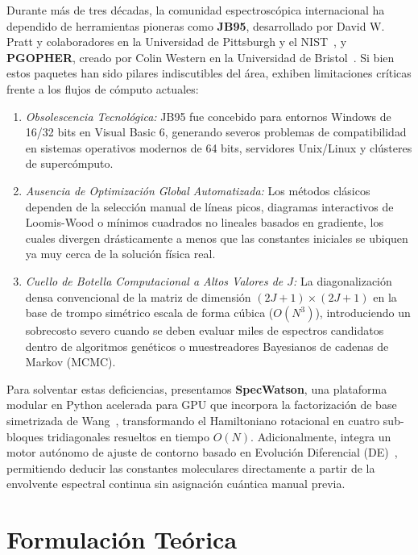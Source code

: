 \documentclass[aps,jcp,reprint,twocolumn,superscriptaddress,showpacs,amsmath,amssymb]{revtex4-2}
\begin{document}
Durante m\'as de tres d\'ecadas, la comunidad espectrosc\'opica internacional ha dependido de herramientas pioneras como \textbf{JB95}, desarrollado por David W. Pratt y colaboradores en la Universidad de Pittsburgh y el NIST~\cite{alvarez2006rotationally}, y \textbf{PGOPHER}, creado por Colin Western en la Universidad de Bristol~\cite{western2014pgopher}. Si bien estos paquetes han sido pilares indiscutibles del \'area, exhiben limitaciones cr\'iticas frente a los flujos de c\'omputo actuales:
\begin{enumerate}
    \item \textit{Obsolescencia Tecnol\'ogica:} JB95 fue concebido para entornos Windows de 16/32 bits en Visual Basic 6, generando severos problemas de compatibilidad en sistemas operativos modernos de 64 bits, servidores Unix/Linux y cl\'usteres de superc\'omputo.
    \item \textit{Ausencia de Optimizaci\'on Global Automatizada:} Los m\'etodos cl\'asicos dependen de la selecci\'on manual de l\'ineas picos, diagramas interactivos de Loomis-Wood o m\'inimos cuadrados no lineales basados en gradiente, los cuales divergen dr\'asticamente a menos que las constantes iniciales se ubiquen ya muy cerca de la soluci\'on f\'isica real.
    \item \textit{Cuello de Botella Computacional a Altos Valores de $J$:} La diagonalizaci\'on densa convencional de la matriz de dimensi\'on $(2J+1) \times (2J+1)$ en la base de trompo sim\'etrico escala de forma c\'ubica ($O(N^3)$), introduciendo un sobrecosto severo cuando se deben evaluar miles de espectros candidatos dentro de algoritmos gen\'eticos o muestreadores Bayesianos de cadenas de Markov (MCMC).
\end{enumerate}

Para solventar estas deficiencias, presentamos \textbf{SpecWatson}, una plataforma modular en Python acelerada para GPU que incorpora la factorizaci\'on de base simetrizada de Wang~\cite{wang1929degree}, transformando el Hamiltoniano rotacional en cuatro sub-bloques tridiagonales resueltos en tiempo $O(N)$. Adicionalmente, integra un motor aut\'onomo de ajuste de contorno basado en Evoluci\'on Diferencial (DE)~\cite{storn1997differential}, permitiendo deducir las constantes moleculares directamente a partir de la envolvente espectral continua sin asignaci\'on cu\'antica manual previa.

\section{Formulaci\'on Te\'orica}
\end{document}
